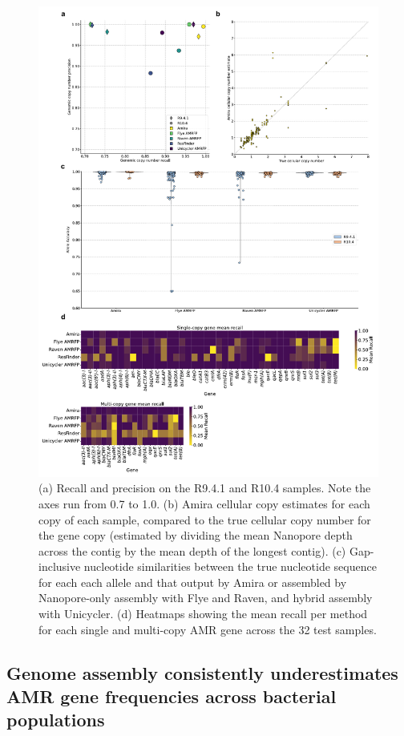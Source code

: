 \begin{figure}
\centering
\includegraphics[width=1\linewidth]{Figures/figure_4.pdf}
\caption{(a) Recall and precision on the R9.4.1 and R10.4 samples. Note the axes run from 0.7 to 1.0. (b) Amira cellular copy estimates for each copy of each sample, compared to the true cellular copy number for the gene copy (estimated by dividing the mean Nanopore depth across the contig by the mean depth of the longest contig). (c) Gap-inclusive nucleotide similarities between the true nucleotide sequence for each each allele and that output by Amira or assembled by Nanopore-only assembly with Flye and Raven, and hybrid assembly with Unicycler. (d) Heatmaps showing the mean recall per method for each single and multi-copy AMR gene across the 32 test samples.}
\label{fig:4}
\end{figure}

\subsection*{Genome assembly consistently underestimates AMR gene frequencies across bacterial populations}
